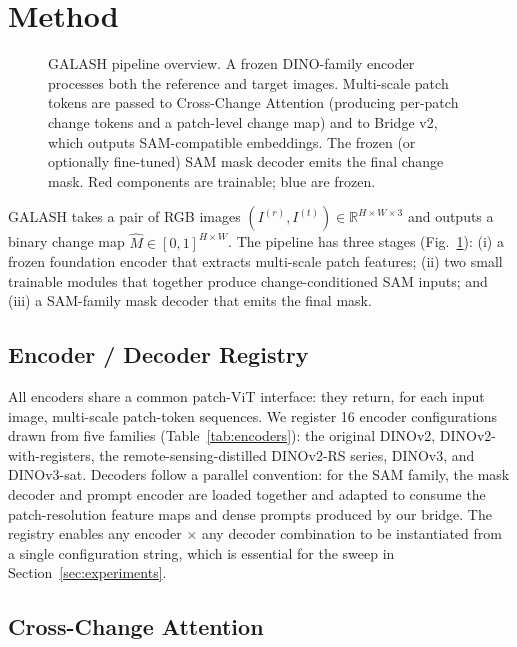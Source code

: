 \section{Method}
\label{sec:method}

\begin{figure}[t]
  \centering
  \fbox{\rule{0pt}{45mm}\rule{130mm}{0pt}}
  \caption{GALASH pipeline overview. A frozen DINO-family encoder processes both
    the reference and target images. Multi-scale patch tokens are passed to
    Cross-Change Attention (producing per-patch change tokens and a patch-level
    change map) and to Bridge v2, which outputs SAM-compatible embeddings.
    The frozen (or optionally fine-tuned) SAM mask decoder emits the final change
    mask. Red components are trainable; blue are frozen.}
  \label{fig:architecture}
\end{figure}

GALASH takes a pair of RGB images $(I^{(r)}, I^{(t)}) \in \mathbb{R}^{H\times W\times 3}$
and outputs a binary change map $\hat{M} \in [0,1]^{H\times W}$. The pipeline has
three stages (Fig.~\ref{fig:architecture}): (i) a frozen foundation encoder
that extracts multi-scale patch features; (ii) two small trainable modules that
together produce change-conditioned SAM inputs; and (iii) a SAM-family mask
decoder that emits the final mask.

\subsection{Encoder / Decoder Registry}
\label{sec:registry}

All encoders share a common patch-ViT interface: they return, for each input
image, multi-scale patch-token sequences. We register 16 encoder configurations
drawn from five families (Table~\ref{tab:encoders}): the original DINOv2,
DINOv2-with-registers, the remote-sensing-distilled DINOv2-RS series, DINOv3,
and DINOv3-sat. Decoders follow a parallel convention: for the SAM family, the
mask decoder and prompt encoder are loaded together and adapted to consume the
patch-resolution feature maps and dense prompts produced by our bridge. The
registry enables any encoder $\times$ any decoder combination to be instantiated
from a single configuration string, which is essential for the sweep in
Section~\ref{sec:experiments}.

\subsection{Cross-Change Attention}
\label{sec:crosschange}

